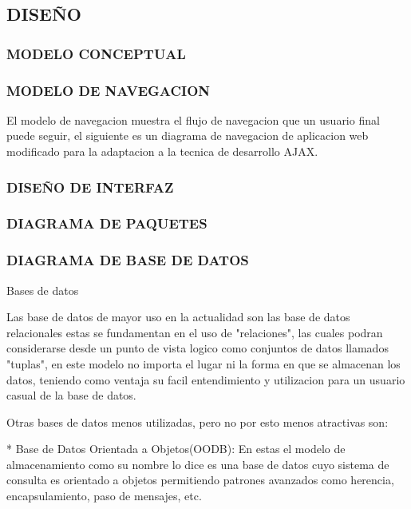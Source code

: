 \subsection{DISEÑO}
\subsubsection{MODELO CONCEPTUAL}

\subsubsection{MODELO DE NAVEGACION}




El modelo de navegacion muestra el flujo de navegacion que un usuario final puede seguir, el siguiente es un diagrama de navegacion de aplicacion web modificado para la adaptacion a la tecnica de desarrollo AJAX.


\subsubsection{DISEÑO DE INTERFAZ}


\subsubsection{DIAGRAMA DE PAQUETES}


\subsubsection{DIAGRAMA DE BASE DE DATOS}

Bases de datos

Las base de datos de mayor uso en la actualidad son las base de datos relacionales estas se fundamentan en el uso de "relaciones", las cuales podran considerarse desde un punto de vista logico como conjuntos de datos llamados "tuplas", en este modelo no importa el lugar ni la forma en que se almacenan los datos, teniendo como ventaja su facil entendimiento y utilizacion para un usuario casual de la base de datos.

Otras bases de datos menos utilizadas, pero no por esto menos atractivas son:

* Base de Datos Orientada a Objetos(OODB): En estas el modelo de almacenamiento como su nombre lo dice es una base de datos cuyo sistema de consulta es orientado a objetos permitiendo patrones avanzados como herencia, encapsulamiento, paso de mensajes, etc.

